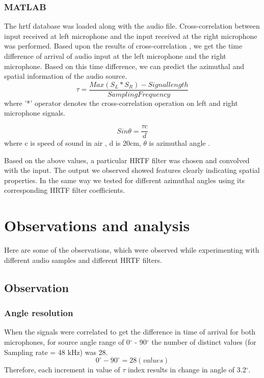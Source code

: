 \documentclass[BTech]{nitkdiss}
\begin{document}
\subsection{MATLAB}
The hrtf database was loaded along with the audio file. Cross-correlation between input received at left microphone and the input received at the right microphone was performed. Based upon the results of cross-correlation , we get the time difference of arrival of audio input at the left microphone and the right microphone. Based on this time difference, we can predict the azimuthal and spatial information of the audio source. 
\begin{equation}
\tau = \frac{Max(S_{L} * S_{R}) - Signal length}{Sampling Frequency} 
\end{equation}
where '*' operator denotes the cross-correlation operation on left and right microphone signals. 

\begin{equation}
Sin\theta = \frac{\tau c}{d}
\end{equation}
where c is speed of sound in air , d is 20cm, $\theta$ is azimuthal angle .

Based on the above values, a particular HRTF filter was chosen and convolved with the input. The output we observed showed features clearly indicating spatial properties. In the same way we tested for different azimuthal angles using its corresponding HRTF filter coefficients.
\chapter{Observations and analysis}
Here are some of the observations, which were observed while experimenting with different audio samples and different HRTF filters.  
\section{Observation}
\subsection{Angle resolution}
When the signals were correlated to get the difference in time of arrival for both microphones, for source angle range of 0$^{\circ}$ - 90$^{\circ}$ the number of distinct values (for Sampling rate = 48 kHz) was 28.
\begin{equation}
0^\circ - 90^\circ = 28 (values)
\end{equation}
Therefore, each increment in value of $\tau$ index results in change in angle of 3.2$^\circ$.
\end{document}
